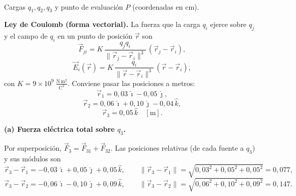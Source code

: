 \documentclass[12pt,letterpaper]{article}
\newcommand{\secgap}{\vspace{0.6cm}}
\newcommand{\ii}{\hat{\imath}}
\newcommand{\jj}{\hat{\jmath}}
\newcommand{\kk}{\hat{k}}
\begin{document}
\noindent
\begin{minipage}[t]{0.40\textwidth}
\centering
\vspace{0pt}
\\[2pt]
{\scriptsize Cargas $q_1,q_2,q_3$ y punto de evaluaci\'on $P$ (coordenadas en cm).}
\end{minipage}%
\hfill
\begin{minipage}[t]{0.56\textwidth}
\vspace{0pt}
\textbf{Ley de Coulomb (forma vectorial).} La fuerza que la carga $q_i$ ejerce sobre $q_j$ y el campo
de $q_i$ en un punto de posici\'on $\vec r$ son
\[
    \vec F_{ji} = K\,\frac{q_j q_i}{\lVert \vec r_j-\vec r_i\rVert^{3}}\,(\vec r_j-\vec r_i),
\]
\[
    \vec E_i(\vec r) = K\,\frac{q_i}{\lVert \vec r-\vec r_i\rVert^{3}}\,(\vec r-\vec r_i),
\]
con $K=9\times10^{9}\ \tfrac{\text{N}\,\text{m}^2}{\text{C}^2}$. Conviene pasar las posiciones a metros:
\[
    \vec r_1 = 0{,}03\,\ii - 0{,}05\,\jj,
\]
\[
    \vec r_2 = 0{,}06\,\ii + 0{,}10\,\jj - 0{,}04\,\kk,
\]
\[
    \vec r_3 = 0{,}05\,\kk \quad[\text{m}].
\]
\end{minipage}

\secgap

\noindent\textbf{(a) Fuerza el\'ectrica total sobre $q_3$.}

Por superposici\'on, $\vec F_3 = \vec F_{31} + \vec F_{32}$. Las posiciones relativas (de cada fuente
a $q_3$) y sus m\'odulos son
\[
    \vec r_3-\vec r_1 = -0{,}03\,\ii + 0{,}05\,\jj + 0{,}05\,\kk,\qquad
    \lVert \vec r_3-\vec r_1\rVert = \sqrt{0{,}03^2+0{,}05^2+0{,}05^2} = 0{,}077,
\]
\[
    \vec r_3-\vec r_2 = -0{,}06\,\ii - 0{,}10\,\jj + 0{,}09\,\kk,\qquad
    \lVert \vec r_3-\vec r_2\rVert = \sqrt{0{,}06^2+0{,}10^2+0{,}09^2} = 0{,}147.
\]
\end{document}
